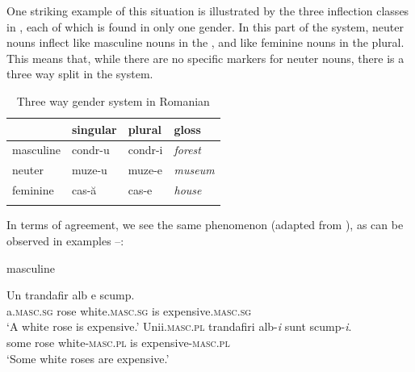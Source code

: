One striking example of this situation is illustrated by the three inflection classes in , each of which is found in only one gender. In this part of the system, neuter nouns inflect like masculine nouns in the , and like feminine nouns in the plural. This means that, while there are no specific markers for neuter nouns, there is a three way split in the system.

\begin{table}
  \centering
  \begin{tabular}{llll}
    \lsptoprule
              & singular                   & plural                    & gloss           \\
    \midrule
    masculine & \cellcolor{gray!25}condr-u & condr-i                    & \textit{forest} \\
    neuter    & \cellcolor{gray!25}muze-u  & \cellcolor{gray!25}muze-e & \textit{museum} \\
    feminine  & cas-ă                      & \cellcolor{gray!25}cas-e  & \textit{house}  \\
    \lspbottomrule
  \end{tabular}
  \caption{Three way gender system in Romanian}\label{tab:gender-rom}
\end{table}

In terms of agreement, we see the same phenomenon (adapted from \citealt{Farkas.1990}), as can be observed in examples --:

\largerpage[2]
\begin{exe}
    \ex \label{romanian-masc-exe} masculine
    \begin{xlist}
        \ex 
        \gll Un trandafir alb e scump.\\
        a.\textsc{masc.sg} rose white.\textsc{masc.sg} is expensive.\textsc{masc.sg}\\
        \glt `A white rose is expensive.'
        \ex 
        \gll Unii.\textsc{masc.pl} trandafiri alb-\textit{i} sunt scump-\textit{i}.\\
        some rose white-\textsc{masc.pl} is expensive-\textsc{masc.pl}\\
        \glt `Some white roses are expensive.'
    \end{xlist}
    \end{exe}
    

